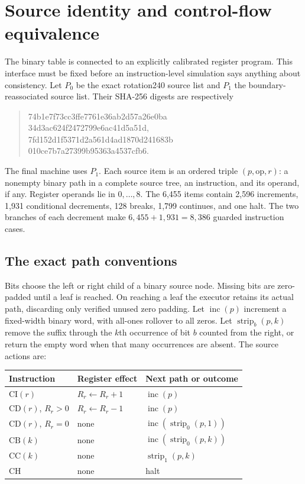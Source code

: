 \section{Source identity and control-flow equivalence}
\label{sec:source}

The binary table is connected to an explicitly calibrated register
program. This interface must be fixed before an instruction-level
simulation says anything about consistency. Let $P_0$ be the exact
rotation240 source list and $P_1$ the boundary-reassociated source list.
Their SHA-256 digests are respectively
\begin{quote}\small\ttfamily
74b1e7f73cc3ffe7761e36ab2d57a26e0ba\\
34d3ac624f2472799e6ac41d5a51d,\\[3pt]
7fd152d1f5371d2a561d4ad1870d241683b\\
010ce7b7a27399b95363a4537cfb6.
\end{quote}
The final machine uses $P_1$. Each source item is an ordered triple
$(p,\mathrm{op},r)$: a nonempty binary path in a complete source tree,
an instruction, and its operand, if any. Register operands lie in
$0,\ldots,8$. The 6,455 items contain 2,596 increments, 1,931
conditional decrements, 128 breaks, 1,799 continues, and one halt.
The two branches of each decrement make $6,455+1,931=8,386$ guarded
instruction cases.

\subsection{The exact path conventions}

Bits choose the left or right child of a binary source node. Missing
bits are zero-padded until a leaf is reached. On reaching a leaf the
executor retains its actual path, discarding only verified unused zero
padding. Let $\operatorname{inc}(p)$ increment a fixed-width binary
word, with all-ones rollover to all zeros. Let
$\operatorname{strip}_b(p,k)$ remove the suffix through the $k$th
occurrence of bit $b$ counted from the right, or return the empty
word when that many occurrences are absent. The source actions are:

\begin{center}
\begin{tabular}{lll}
\toprule
Instruction&Register effect&Next path or outcome\\
\midrule
$\mathrm{CI}(r)$&$R_r\gets R_r+1$&$\operatorname{inc}(p)$\\
$\mathrm{CD}(r)$, $R_r>0$&$R_r\gets R_r-1$&$\operatorname{inc}(p)$\\
$\mathrm{CD}(r)$, $R_r=0$&none&$\operatorname{inc}(\operatorname{strip}_0(p,1))$\\
$\mathrm{CB}(k)$&none&$\operatorname{inc}(\operatorname{strip}_0(p,k))$\\
$\mathrm{CC}(k)$&none&$\operatorname{strip}_1(p,k)$\\
$\mathrm{CH}$&none&halt\\
\bottomrule
\end{tabular}
\end{center}

